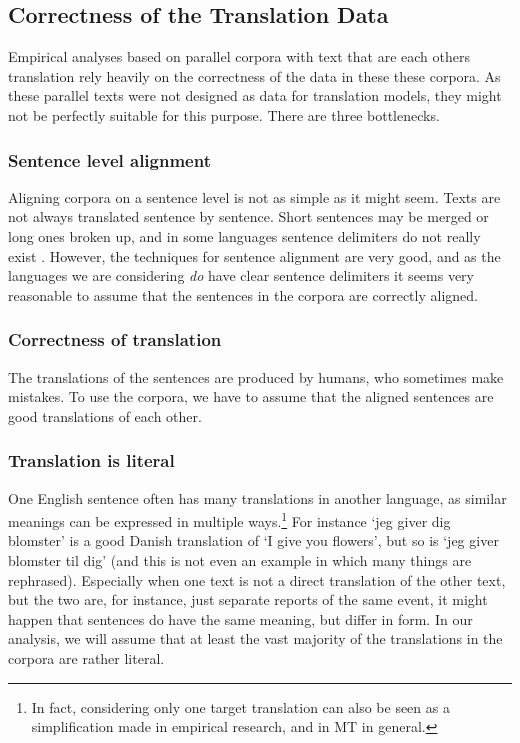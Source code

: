 \subsection{Correctness of the Translation Data}

Empirical analyses based on parallel corpora with text that are each others translation rely heavily on the correctness of the data in these these corpora. As these parallel texts were not designed as data for translation models, they might not be perfectly suitable for this purpose. There are three bottlenecks.

\subsubsection{Sentence level alignment}
Aligning corpora on a sentence level is not as simple as it might seem. Texts are not always translated sentence by sentence. Short sentences may be merged or long ones broken up, and in some languages sentence delimiters do not really exist \citep[p.55]{koehn2008statistical}. However, the techniques for sentence alignment are very good, and as the languages we are considering \textit{do} have clear sentence delimiters it seems very reasonable to assume that the sentences in the corpora are correctly aligned.

\subsubsection{Correctness of translation}
The translations of the sentences are produced by humans, who sometimes make mistakes. To use the corpora, we have to assume that the aligned sentences are good translations of each other.

\subsubsection{Translation is literal}
One English sentence often has many translations in another language, as similar meanings can be expressed in multiple ways.\footnote{In fact, considering only one target translation can also be seen as a simplification made in empirical research, and in MT in general.} For instance `jeg giver dig blomster' is a good Danish translation of `I give you flowers', but so is `jeg giver blomster til dig' (and this is not even an example in which many things are rephrased). Especially when one text is not a direct translation of the other text, but the two are, for instance, just separate reports of the same event, it might happen that sentences do have the same meaning, but differ in form. In our analysis, we will assume that at least the vast majority of the translations in the corpora are rather literal.
 
